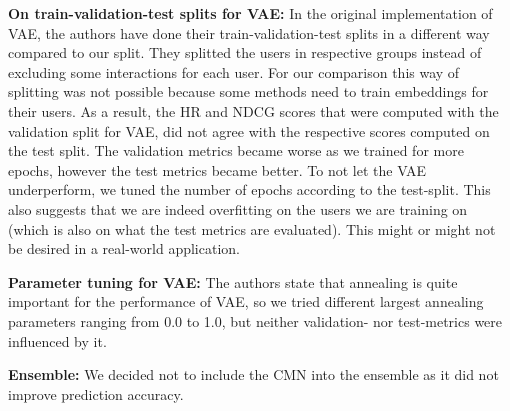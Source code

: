 \textbf{On train-validation-test splits for VAE:} 
In the original implementation of VAE, the authors have done their train-validation-test splits in a different way compared to our split.
They splitted the users in respective groups instead of excluding some interactions for each user. 
For our comparison this way of splitting was not possible because some methods need to train embeddings for their users. 
As a result, the HR and NDCG scores that were computed with the validation split for VAE, did not agree with the respective scores computed on the test split. 
The validation metrics became worse as we trained for more epochs, however the test metrics became better. 
To not let the VAE underperform, we tuned the number of epochs according to the test-split. 
This also suggests that we are indeed overfitting on the users we are training on (which is also on what the test metrics are evaluated). 
This might or might not be desired in a real-world application.

\textbf{Parameter tuning for VAE:} 
The authors state that annealing is quite important for the performance of VAE, so we tried different largest annealing parameters ranging from 0.0 to 1.0, but neither validation- nor test-metrics were influenced by it.

\textbf{Ensemble:} 
We decided not to include the CMN into the ensemble as it did not improve prediction accuracy.

